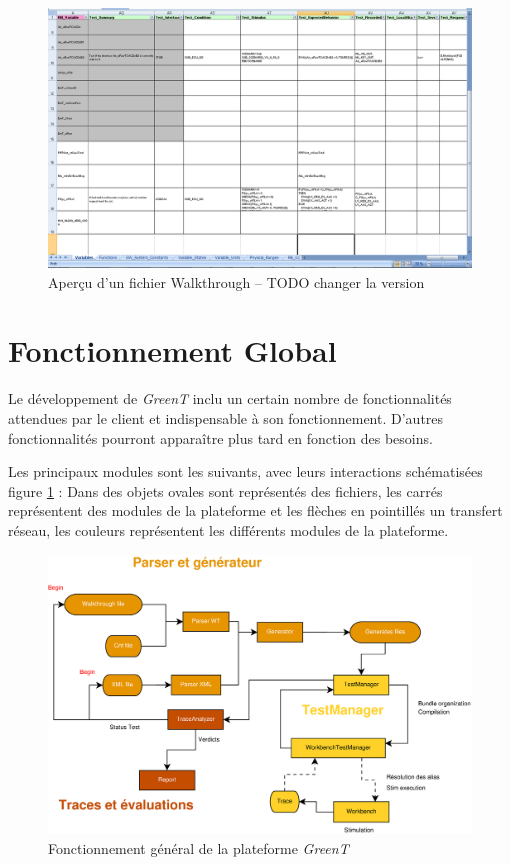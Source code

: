 \begin{figure}[H]
	\centering
	\includegraphics[width=18.5cm]{contents/images/walkthrough.png}
	\caption{Aperçu d'un fichier Walkthrough -- TODO changer la version}
\end{figure}
\section{Fonctionnement Global}
Le développement de \textit{GreenT} inclu un certain nombre de fonctionnalités attendues par le client et indispensable à son fonctionnement. D'autres fonctionnalités pourront apparaître plus tard en fonction des besoins.

Les principaux modules sont les suivants, avec leurs interactions schématisées figure \ref{fig:generalDiag} : 
Dans des objets ovales sont représentés des fichiers, les carrés représentent des modules de la plateforme et les flèches en pointillés un transfert réseau, les couleurs représentent les différents modules de la plateforme.

\begin{figure}[H]
	\centering
	\includegraphics[width=19.5cm]{contents/images/generalDiag.eps}
	\caption{Fonctionnement général de la plateforme \textit{GreenT}}
	\label{fig:generalDiag}
\end{figure}	


